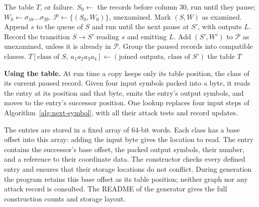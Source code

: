 \begin{algorithm}[!ht]
\caption{Building the table}
\label{alg:table}
\renewcommand{\algorithmicensure}{\textbf{Output:}}
\begin{algorithmic}[1]
\Ensure The table $T$, or failure.
\State $S_0\gets$ the records before column $30$, run until they pause; $W_0\gets\sigma_{18}\dots\sigma_{29}$.
\State $\mathcal P\gets\{(S_0,W_0)\}$, unexamined.
  \State Mark $(S,W)$ as examined.
    \State Append $s$ to the queue of $S$ and run until the next pause at $S'$, with outputs $L$.
    \State Record the transition $S\to S'$ reading $s$ and emitting $L$.
    \State Add $(S',W')$ to $\mathcal P$ as unexamined, unless it is already in $\mathcal P$.
  \EndFor
\EndWhile
\State Group the paused records into compatible classes.
  \State $T[\text{class of }S,\ a_1a_2a_3a_4]\gets(\text{joined outputs},\ \text{class of }S')$
\EndFor
\State \Return the table $T$
\end{algorithmic}
\end{algorithm}

\medskip\noindent
\textbf{Using the table.}
At run time a copy keeps only its table position, the class of its
current paused record. Given four input symbols packed into a byte,
it reads the entry at its position and that byte, emits the entry's
output symbols, and moves to the entry's successor position. One
lookup replaces four input steps of Algorithm~\ref{alg:next-symbol},
with all their attack tests and record updates.

The entries are stored in a fixed array of $64$-bit words. Each class
has a base offset into this array: adding the input byte gives the
location to read. The entry contains the successor's base offset, the
packed output symbols, their number, and a reference to their
coordinate data. The constructor checks every defined entry and
ensures that their storage locations do not conflict. During
generation the program retains this base offset as its table
position; neither graph nor any attack record is consulted. The
README of the generator gives the full construction counts and
storage layout.

